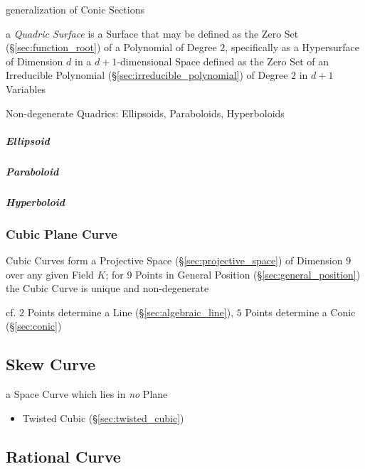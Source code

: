 \begin{itemize}
generalization of Conic Sections

a \emph{Quadric Surface} is a Surface that may be defined as the Zero Set
(\S\ref{sec:function_root}) of a Polynomial of Degree $2$, specifically as a
Hypersurface of Dimension $d$ in a $d+1$-dimensional Space defined as the Zero
Set of an Irreducible Polynomial (\S\ref{sec:irreducible_polynomial}) of Degree
$2$ in $d+1$ Variables

Non-degenerate Quadrics: Ellipsoids, Paraboloids, Hyperboloids



\subparagraph{Ellipsoid}\label{sec:ellipsoid}\hfill

\subparagraph{Paraboloid}\label{sec:paraboloid}\hfill

\subparagraph{Hyperboloid}\label{sec:hyperboloid}\hfill



\subsubsection{Cubic Plane Curve}\label{sec:cubic_plane_curve}

Cubic Curves form a Projective Space (\S\ref{sec:projective_space}) of
Dimension $9$ over any given Field $K$; for $9$ Points in General Position
(\S\ref{sec:general_position}) the Cubic Curve is unique and non-degenerate

cf. $2$ Points determine a Line (\S\ref{sec:algebraic_line}), $5$ Points
determine a Conic (\S\ref{sec:conic})



\subsection{Skew Curve}\label{sec:skew_curve}

a Space Curve which lies in \emph{no} Plane

\begin{itemize}
  \item Twisted Cubic (\S\ref{sec:twisted_cubic})
\end{itemize}



\subsection{Rational Curve}\label{sec:rational_curve}


\end{itemize}
